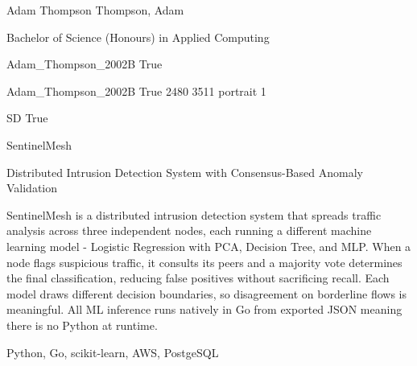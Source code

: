 
\begingroup{}\relax



\def\Key{Adam_Thompson_2002B}

{Adam Thompson}
{Thompson, Adam}

{Bachelor of Science (Honours) in Applied Computing}

{Adam_Thompson_2002B}
{True}

{Adam_Thompson_2002B}
{True}
{2480}
{3511}
{portrait}
{1}

{SD}
{True}

{SentinelMesh}

{Distributed Intrusion Detection System with Consensus-Based Anomaly Validation}

{SentinelMesh is a distributed intrusion detection system that spreads traffic analysis across three independent nodes, each running a different machine learning model - Logistic Regression with PCA, Decision Tree, and MLP. When a node flags suspicious traffic, it consults its peers and a majority vote determines the final classification, reducing false positives without sacrificing recall. Each model draws different decision boundaries, so disagreement on borderline flows is meaningful. All ML inference runs natively in Go from exported JSON meaning there is no Python at runtime.}

{Python, Go, scikit-learn, AWS, PostgeSQL}

